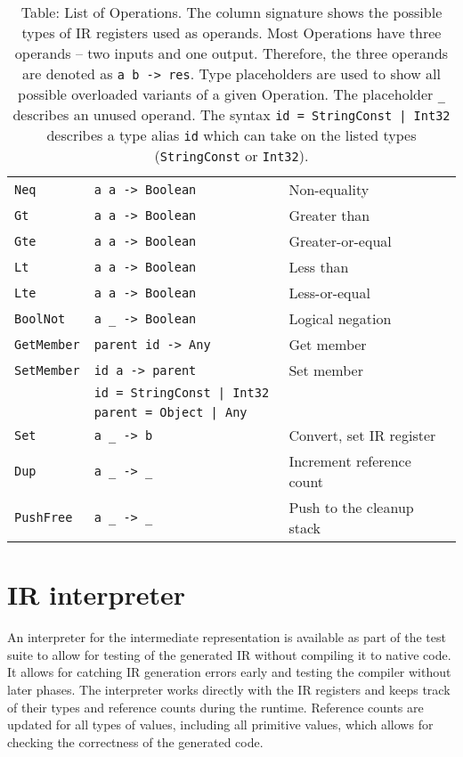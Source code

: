 \begin{table}
\begin{tabular}{l | l | l}
        \texttt{Neq}         & \texttt{a      a     -> Boolean  } &  Non-equality               \\
        \texttt{Gt}          & \texttt{a      a     -> Boolean  } &  Greater than               \\
        \texttt{Gte}         & \texttt{a      a     -> Boolean  } &  Greater-or-equal           \\
        \texttt{Lt}          & \texttt{a      a     -> Boolean  } &  Less than                  \\
        \texttt{Lte}         & \texttt{a      a     -> Boolean  } &  Less-or-equal              \\
        \texttt{BoolNot}     & \texttt{a      \_    -> Boolean  } &  Logical negation           \\\hline
        \texttt{GetMember}   & \texttt{parent id    -> Any      } &  Get member                 \\
        \texttt{SetMember}   & \texttt{id     a     -> parent   } &  Set member                 \\
                             & \texttt{id = StringConst | Int32 } &                             \\
                             & \texttt{parent = Object | Any    } &                             \\\hline
        \texttt{Set}         & \texttt{a      \_    -> b        } &  Convert, set IR register   \\
        \texttt{Dup}         & \texttt{a      \_    -> \_       } &  Increment reference count  \\
        \texttt{PushFree}    & \texttt{a      \_    -> \_       } &  Push to the cleanup stack  \\
    \end{tabular}
    \caption{Table: List of Operations. The column signature shows the possible types of IR registers used as operands. Most Operations have three operands -- two inputs and one output. Therefore, the three operands are denoted as \texttt{a b -> res}. Type placeholders are used to show all possible overloaded variants of a given Operation. The placeholder \texttt{\_} describes an unused operand. The syntax \texttt{id = StringConst | Int32} describes a type alias \texttt{id} which can take on the listed types (\texttt{StringConst} or \texttt{Int32}). }
    \label{tab:opcodes}
\end{table}


\section{IR interpreter}

An interpreter for the intermediate representation is available as part of the test suite to allow for testing of the generated IR without compiling it to native code. It allows for catching IR generation errors early and testing the compiler without later phases. The interpreter works directly with the IR registers and keeps track of their types and reference counts during the runtime. Reference counts are updated for all types of values, including all primitive values, which allows for checking the correctness of the generated code.

